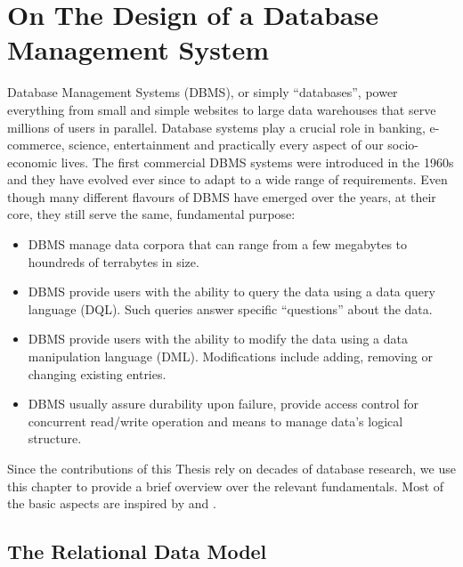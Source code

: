 \chapter{On The Design of a Database Management System}
\label{chapter:theory_databases}


Database Management Systems (DBMS), or simply ``databases'', power everything from small and simple websites to large data warehouses that serve millions of users in parallel. Database systems play a crucial role in banking, e-commerce, science, entertainment and practically every aspect of our socio-economic lives. The first commercial DBMS systems were introduced in the 1960s \cite{Garcia:2009Database} and they have evolved ever since to adapt to a wide range of requirements. Even though many different flavours of DBMS have emerged over the years, at their core, they still serve the same, fundamental purpose:

\begin{itemize}
    \item DBMS manage data corpora that can range from a few megabytes to houndreds of terrabytes in size.
    \item DBMS provide users with the ability to query the data using a data query language (DQL). Such queries answer specific ``questions'' about the data.
    \item DBMS provide users with the ability to modify the data using a data manipulation language (DML). Modifications include adding, removing or changing existing entries.
    \item DBMS usually assure durability upon failure, provide access control for concurrent read/write operation and means to manage data's logical structure.
\end{itemize}

Since the contributions of this Thesis rely on decades of database research, we use this chapter to provide a brief overview over the relevant fundamentals. Most of the basic aspects are inspired by \cite{Garcia:2009Database} and \cite{Petrov:2019Database}.


\section{The Relational Data Model}
\label{section:relational_data_model}

